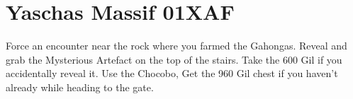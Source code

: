 \chapter{Yaschas Massif 01XAF}

Force an encounter near the rock where you farmed the Gahongas. Reveal and grab the Mysterious Artefact on the top of the stairs. Take the 600 Gil if you accidentally reveal it. Use the Chocobo,  Get the 960 Gil chest if you haven't already while heading to the gate.
\newline
